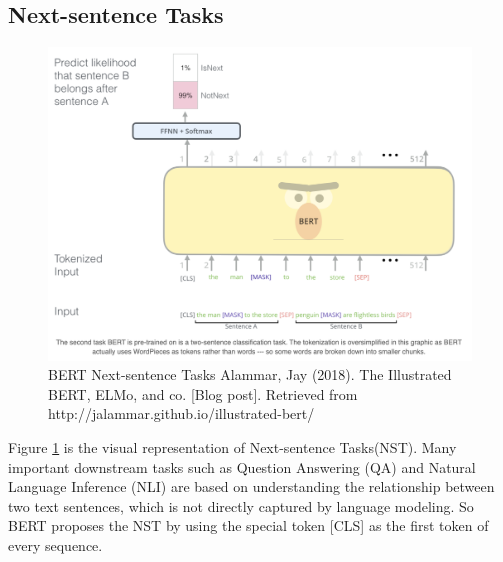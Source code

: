 \documentclass[]{krantz}
\begin{document}
\hypertarget{next-sentence-tasks}{%
\subsection{Next-sentence Tasks}\label{next-sentence-tasks}}

\begin{figure}

{\centering \includegraphics[width=0.7\linewidth]{figures/02-03-transfer-learning-for-nlp/bert_nsp} 

}

\caption{BERT Next-sentence Tasks  
 Alammar, Jay (2018). The Illustrated BERT, ELMo, and co. [Blog post]. Retrieved from http://jalammar.github.io/illustrated-bert/}\label{fig:ch02-03-figure04}
\end{figure}

Figure \ref{fig:ch02-03-figure04} is the visual representation of Next-sentence Tasks(NST).
Many important downstream tasks such as Question Answering (QA) and Natural Language Inference (NLI) are based on understanding the relationship between two text sentences, which is not directly captured by language modeling. So BERT proposes the NST by using the special token {[}CLS{]} as the first token of every sequence.
\end{document}
